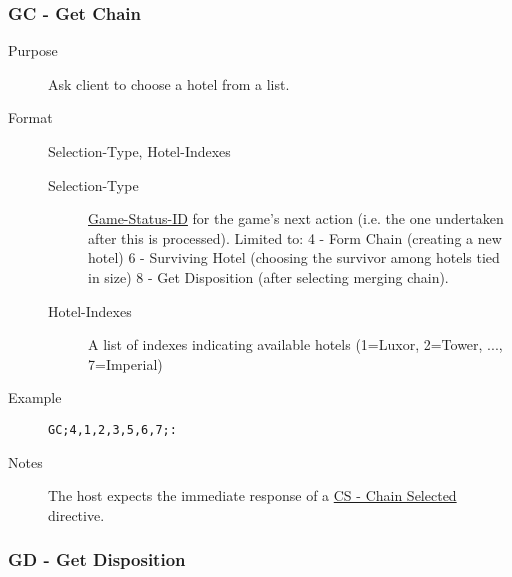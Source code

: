 \documentclass{article}
\providecommand{\wiredata}[1]{\texttt{{#1}}}
\begin{document}

\subsubsection{GC - Get Chain} %
\label{ssub:gc_get_chain}

\begin{description}
  \item[Purpose] Ask client to choose a hotel from a list.
  \item[Format] Selection-Type, Hotel-Indexes
  \begin{description}
    \item[Selection-Type] \hyperref[ssub:game_status_id]{Game-Status-ID} for the game's next action (i.e. the one undertaken after this is processed). Limited to: 4 - Form Chain (creating a new hotel) 6 - Surviving Hotel (choosing the survivor among hotels tied in size) 8 - Get Disposition (after selecting merging chain).
    \item[Hotel-Indexes] A list of indexes indicating available hotels (1=Luxor, 2=Tower, ..., 7=Imperial)
  \end{description}
  \item[Example] \wiredata{GC;4,1,2,3,5,6,7;:}
  \item[Notes] The host expects the immediate response of a \hyperref[ssub:cs_chain_selected]{CS - Chain Selected} directive.
\end{description}


\subsubsection{GD - Get Disposition} %
\label{ssub:gd_get_disposition}
\end{document}
